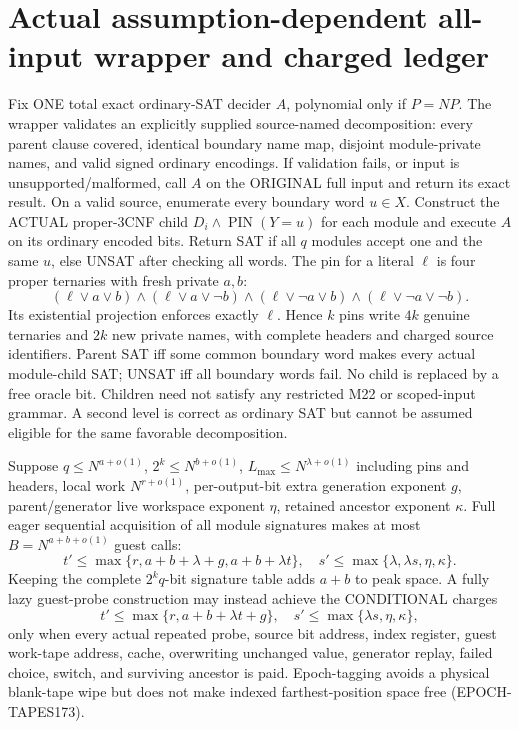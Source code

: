 \documentclass[11pt]{article}
\begin{document}
\section{Actual assumption-dependent all-input wrapper and charged ledger}
Fix ONE total exact ordinary-SAT decider $A$, polynomial only if $P=NP$.
The wrapper validates an explicitly supplied source-named decomposition:
every parent clause covered, identical boundary name map, disjoint
module-private names, and valid signed ordinary encodings. If validation
fails, or input is unsupported/malformed, call $A$ on the ORIGINAL full
input and return its exact result. On a valid source, enumerate every
boundary word $u\in X$. Construct the ACTUAL proper-3CNF child
$D_i\wedge\operatorname{PIN}(Y=u)$ for each module and execute $A$
on its ordinary encoded bits. Return SAT if all $q$ modules accept one
and the same $u$, else UNSAT after checking all words.
The pin for a literal $\ell$ is four proper ternaries with fresh
private $a,b$:
\[
(\ell\lor a\lor b)\land(\ell\lor a\lor\neg b)\land
(\ell\lor\neg a\lor b)\land(\ell\lor\neg a\lor\neg b).
\]
Its existential projection enforces exactly $\ell$. Hence $k$ pins
write $4k$ genuine ternaries and $2k$ new private names, with complete
headers and charged source identifiers. Parent SAT iff some common
boundary word makes every actual module-child SAT; UNSAT iff all
boundary words fail. No child is replaced by a free oracle bit.
Children need not satisfy any restricted M22 or scoped-input grammar.
A second level is correct as ordinary SAT but cannot be assumed
eligible for the same favorable decomposition.

Suppose $q\le N^{a+o(1)}$, $2^k\le N^{b+o(1)}$,
$L_{\max}\le N^{\lambda+o(1)}$ including pins and headers,
local work $N^{r+o(1)}$, per-output-bit extra generation exponent
$g$, parent/generator live workspace exponent $\eta$, retained
ancestor exponent $\kappa$. Full eager sequential acquisition of all
module signatures makes at most $B=N^{a+b+o(1)}$ guest calls:
\[
t'\le\max\{r,a+b+\lambda+g,a+b+\lambda t\},\quad
s'\le\max\{\lambda,\lambda s,\eta,\kappa\}.
\]
Keeping the complete $2^kq$-bit signature table adds $a+b$ to
peak space. A fully lazy guest-probe construction may instead
achieve the CONDITIONAL charges
\[
t'\le\max\{r,a+b+\lambda t+g\},\quad
s'\le\max\{\lambda s,\eta,\kappa\},
\]
only when every actual repeated probe, source bit address, index
register, guest work-tape address, cache, overwriting unchanged value,
generator replay, failed choice, switch, and surviving ancestor
is paid. Epoch-tagging avoids a physical blank-tape wipe but does
not make indexed farthest-position space free (EPOCH-TAPES173).
\end{document}
